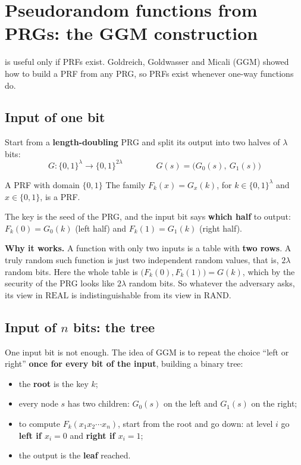 
\section{Pseudorandom functions from PRGs: the GGM construction}

 is useful only if PRFs exist. Goldreich, Goldwasser and Micali (GGM) showed how to build a PRF from any PRG, so PRFs exist whenever one-way functions do.

\subsection{Input of one bit}

Start from a \textbf{length-doubling} PRG and split its output into two halves of $\lambda$ bits:
\[
  G : \{0,1\}^\lambda \to \{0,1\}^{2\lambda} \qquad\qquad G(s) = \big(G_0(s),\ G_1(s)\big)
\]

\begin{framedprop}[label={prop:ggm-one-bit}]{A PRF with domain $\{0,1\}$}
  The family $F_k(x) = G_x(k)$, for $k \in \{0,1\}^\lambda$ and $x \in \{0,1\}$, is a PRF.
\end{framedprop}

The key is the seed of the PRG, and the input bit says \textbf{which half} to output: $F_k(0) = G_0(k)$ (left half) and $F_k(1) = G_1(k)$ (right half).

\textbf{Why it works.} A function with only two inputs is a table with \textbf{two rows}. A truly random such function is just two independent random values, that is, $2\lambda$ random bits. Here the whole table is $\big(F_k(0), F_k(1)\big) = G(k)$, which by the security of the PRG looks like $2\lambda$ random bits. So whatever the adversary asks, its view in $\mathrm{REAL}$ is indistinguishable from its view in $\mathrm{RAND}$.

\subsection{Input of $n$ bits: the tree}

One input bit is not enough. The idea of GGM is to repeat the choice ``left or right'' \textbf{once for every bit of the input}, building a binary tree:
\begin{itemize}
  \item the \textbf{root} is the key $k$;
  \item every node $s$ has two children: $G_0(s)$ on the left and $G_1(s)$ on the right;
  \item to compute $F_k(x_1 x_2 \cdots x_n)$, start from the root and go down: at level $i$ go \textbf{left if $x_i = 0$} and \textbf{right if $x_i = 1$};
  \item the output is the \textbf{leaf} reached.
\end{itemize}

